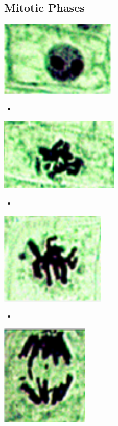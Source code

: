 \begin{itemize}
  \section{Mitotic Phases}
  \begin{center}
    \includegraphics[scale=0.5]{images/week-1-mp1.png}
  \end{center}
  \begin{itemize}
    \item 
  \end{itemize}
  \begin{center}
    \includegraphics[scale=0.5]{images/week-1-mp2.png}
  \end{center}
  \begin{itemize}
    \item 
  \end{itemize}
  \begin{center}
    \includegraphics[scale=0.5]{images/week-1-mp3.png}
  \end{center}
  \begin{itemize}
    \item 
  \end{itemize}
  \begin{center}
    \includegraphics[scale=0.5]{images/week-1-mp4.png}

\end{center}
\end{itemize}
